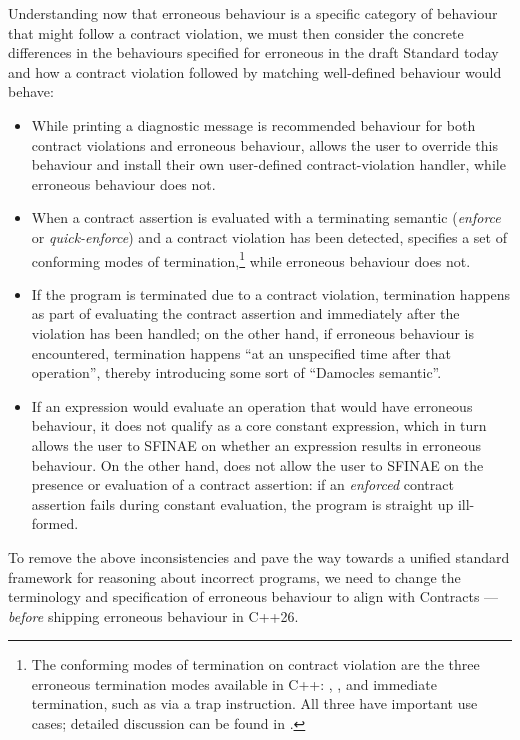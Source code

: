 Understanding now that erroneous behaviour is a specific category of behaviour that might follow a contract violation, we must then consider the concrete differences in the behaviours specified for erroneous in the draft Standard today and how a contract violation followed by matching well-defined behaviour would behave:
\begin{itemize}
\item While printing a diagnostic message is recommended behaviour for both contract violations and erroneous behaviour, \cite{P2900R13} allows the user to override this behaviour and install their own user-defined contract-violation handler, while erroneous behaviour does not.

\item When a contract assertion is evaluated with a terminating semantic (\emph{enforce} or \emph{quick-enforce}) and a contract violation has been detected, \cite{P2900R13} specifies a set of conforming modes of termination,\footnote{The conforming modes of termination on contract violation are the three erroneous termination modes available in C++: , , and immediate termination, such as via a trap instruction. All three have important use cases; detailed discussion can be found in \cite{P3520R0}.} while erroneous behaviour does not.

\item If the program is terminated due to a contract violation, termination happens as part of evaluating the contract assertion and immediately after the violation has been handled; on the other hand, if erroneous behaviour is encountered, termination happens ``at an unspecified time after that operation'', thereby introducing some sort of ``Damocles semantic''. 

\item If an expression would evaluate an operation that would have erroneous behaviour, it does not qualify as a core constant expression, which in turn allows the user to SFINAE on whether an expression results in erroneous behaviour. On the other hand, \cite{P2900R13} does not allow the user to SFINAE on the presence or evaluation of a contract assertion: if an \emph{enforced} contract assertion fails during constant evaluation, the program is straight up ill-formed. 
\end{itemize}

To remove the above inconsistencies and pave the way towards a unified standard framework for reasoning about incorrect programs, we need to change the terminology and specification of erroneous behaviour to align with Contracts --- \emph{before} shipping erroneous behaviour in C++26.



